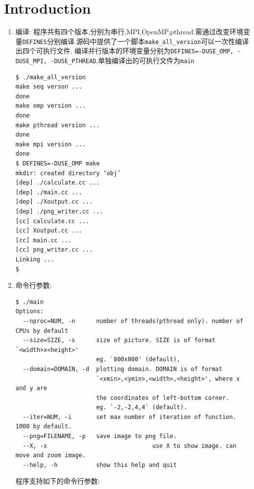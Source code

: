 \section{Introduction}

\begin{enumerate}
	\item 编译:
		程序共有四个版本,分别为串行,MPI,OpenMP,pthread.需通过改变环境变量\verb|DEFINES|分别编译.源码中提供了一个脚本\verb|make_all_version|可以一次性编译出四个可执行文件.
		编译并行版本的环境变量分别为\verb|DEFINES=-DUSE_OMP, -DUSE_MPI, -DUSE_PTHREAD|,单独编译出的可执行文件为\verb|main|
\begin{lstlisting}
$ ./make_all_version
make seq verson ...
done
make omp version ...
done
make pthread version ...
done
make mpi version ...
done
$ DEFINES=-DUSE_OMP make
mkdir: created directory ‘obj’
[dep] ./calculate.cc ...
[dep] ./main.cc ...
[dep] ./Xoutput.cc ...
[dep] ./png_writer.cc ...
[cc] calculate.cc ...
[cc] Xoutput.cc ...
[cc] main.cc ...
[cc] png_writer.cc ...
Linking ...
$
\end{lstlisting}

\item 命令行参数:
	\begin{lstlisting}[basicstyle=\scriptsize\ttfamily]
$ ./main
Options:
  --nproc=NUM, -n      number of threads(pthread only). number of CPUs by default
  --size=SIZE, -s      size of picture. SIZE is of format `<width>x<height>'
                       eg. `800x800' (default),
  --domain=DOMAIN, -d  plotting domain. DOMAIN is of format
                       `<xmin>,<ymin>,<width>,<height>', where x and y are
                       the coordinates of left-bottom corner.
                       eg. `-2,-2,4,4` (default).
  --iter=NUM, -i       set max number of iteration of function. 1000 by default.
  --png=FILENAME, -p   save image to png file.
  --X, -x                              use X to show image. can move and zoom image.
  --help, -h           show this help and quit
\end{lstlisting}
程序支持如下的命令行参数:



\end{enumerate}
